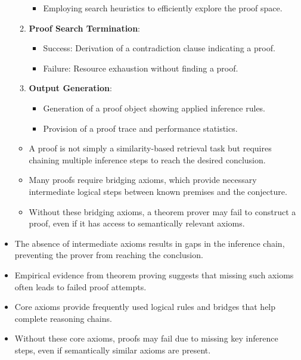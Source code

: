 \documentclass[english,version-2020-11]{uzl-thesis}
\begin{document}
\begin{itemize}
\begin{enumerate}
\begin{itemize}
            \item Employing search heuristics to efficiently explore the proof space.
        \end{itemize}
        \item \textbf{Proof Search Termination}:
        \begin{itemize}
            \item Success: Derivation of a contradiction clause indicating a proof.
            \item Failure: Resource exhaustion without finding a proof.
        \end{itemize}
        \item \textbf{Output Generation}:
        \begin{itemize}
            \item Generation of a proof object showing applied inference rules.
            \item Provision of a proof trace and performance statistics.
        \end{itemize}
    \end{enumerate}
    
    \begin{itemize}
        \item A proof is not simply a similarity-based retrieval task but requires chaining multiple inference steps to reach the desired conclusion.
        \item Many proofs require bridging axioms, which provide necessary intermediate logical steps between known premises and the conjecture.
        \item Without these bridging axioms, a theorem prover may fail to construct a proof, even if it has access to semantically relevant axioms.
    \end{itemize}
    \item The absence of intermediate axioms results in gaps in the inference chain, preventing the prover from reaching the conclusion.
    \item Empirical evidence from theorem proving suggests that missing such axioms often leads to failed proof attempts.
    \item Core axioms provide frequently used logical rules and bridges that help complete reasoning chains.
    \item Without these core axioms, proofs may fail due to missing key inference steps, even if semantically similar axioms are present.
\end{itemize}
\end{document}
